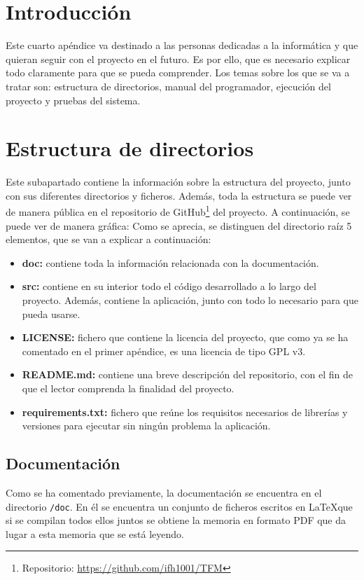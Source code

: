 
\section{Introducción}
Este cuarto apéndice va destinado a las personas dedicadas a la informática y que quieran seguir con el proyecto en el futuro. Es por ello, que es necesario explicar todo claramente para que se pueda comprender. Los temas sobre los que se va a tratar son: estructura de directorios, manual del programador, ejecución del proyecto y pruebas del sistema.

\section{Estructura de directorios}
Este subapartado contiene la información sobre la estructura del proyecto, junto con sus diferentes directorios y ficheros. Además, toda la estructura se puede ver de manera pública en el repositorio de GitHub\footnote{Repositorio: \url{https://github.com/ifh1001/TFM}} del proyecto. A continuación, se puede ver de manera gráfica:
Como se aprecia, se distinguen del directorio raíz 5 elementos, que se van a explicar a continuación:
\begin{itemize}
    \item \textbf{doc:} contiene toda la información relacionada con la documentación.
    \item \textbf{src:} contiene en su interior todo el código desarrollado a lo largo del proyecto. Además, contiene la aplicación, junto con todo lo necesario para que pueda usarse.
    \item \textbf{LICENSE:} fichero que contiene la licencia del proyecto, que como ya se ha comentado en el primer apéndice, es una licencia de tipo GPL v3.
    \item \textbf{README.md:} contiene una breve descripción del repositorio, con el fin de que el lector comprenda la finalidad del proyecto.
    \item \textbf{requirements.txt:} fichero que reúne los requisitos necesarios de librerías y versiones para ejecutar sin ningún problema la aplicación.
\end{itemize}

\subsection{Documentación}
Como se ha comentado previamente, la documentación se encuentra en el directorio \texttt{/doc}. En él se encuentra un conjunto de ficheros escritos en \LaTeX que si se compilan todos ellos juntos se obtiene la memoria en formato PDF que da lugar a esta memoria que se está leyendo.

